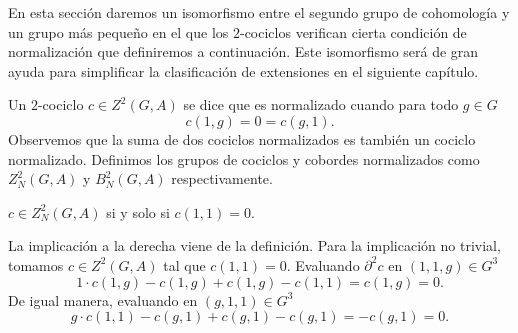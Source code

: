 En esta sección daremos un isomorfismo entre el segundo grupo de cohomología y un grupo más pequeño en el que los $2$-cociclos verifican cierta condición de normalización que definiremos a continuación. Este isomorfismo será de gran ayuda para simplificar la clasificación de extensiones en el siguiente capítulo.

%

\begin{definicion}%
	Un $2$-cociclo $c\in Z^2(G,A)$ se dice que es normalizado cuando para todo $g\in G$
	\begin{equation*}
		c(1,g)= 0 = c(g,1).
	\end{equation*}
	Observemos que la suma de dos cociclos normalizados es también un cociclo normalizado. Definimos los grupos de cociclos y cobordes normalizados como $Z^2_N(G,A)$ y $B^2_N(G,A)$ respectivamente.
\end{definicion}

\begin{proposicion}
	$c\in Z^2_N(G,A)$ si y solo si $c(1,1)=0$.
	\begin{demostracion}
		La implicación a la derecha viene de la definición. Para la implicación no trivial, tomamos $c\in Z^2(G,A)$ tal que $c(1,1) = 0$. 
		Evaluando $\partial^2 c$ en $(1,1,g)\in G^3$
		\begin{equation*}
			1\cdot c(1,g) - c(1,g) + c(1,g) - c(1,1) = c(1,g) =0.
		\end{equation*} 
		De igual manera, evaluando en $(g,1,1)\in G^3$
		\begin{equation*}
			g\cdot c(1,1) - c(g,1) + c(g,1) - c(g,1) = -c(g,1) = 0.
		\end{equation*}
	\end{demostracion}
\end{proposicion}

